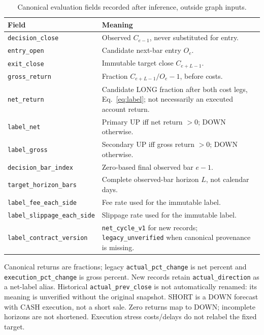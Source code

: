 \begin{table}[htbp]
\centering\small
\caption{Canonical evaluation fields recorded after inference, outside graph inputs.}
\label{tab:target_schema}
\begin{tabularx}{\linewidth}{lX}
\hline
Field & Meaning \\
\hline
\texttt{decision\_close} & Observed $C_{e-1}$, never substituted for entry. \\
\texttt{entry\_open} & Candidate next-bar entry $O_e$. \\
\texttt{exit\_close} & Immutable target close $C_{e+L-1}$. \\
\texttt{gross\_return} & Fraction $C_{e+L-1}/O_e-1$, before costs. \\
\texttt{net\_return} & Candidate LONG fraction after both cost legs, Eq.~\eqref{eq:label}; not necessarily an executed account return. \\
\texttt{label\_net} & Primary UP iff net return $>0$; DOWN otherwise. \\
\texttt{label\_gross} & Secondary UP iff gross return $>0$; DOWN otherwise. \\
\texttt{decision\_bar\_index} & Zero-based final observed bar $e-1$. \\
\texttt{target\_horizon\_bars} & Complete observed-bar horizon $L$, not calendar days. \\
\texttt{label\_fee\_each\_side} & Fee rate used for the immutable label. \\
\texttt{label\_slippage\_each\_side} & Slippage rate used for the immutable label. \\
\texttt{label\_contract\_version} & \texttt{net\_cycle\_v1} for new records; \texttt{legacy\_unverified} when canonical provenance is missing. \\
\hline
\end{tabularx}
\par\smallskip\footnotesize Canonical returns are fractions; legacy \texttt{actual\_pct\_change} is net percent and \texttt{execution\_pct\_change} is gross percent. New records retain \texttt{actual\_direction} as a net-label alias. Historical \texttt{actual\_prev\_close} is not automatically renamed: its meaning is unverified without the original snapshot. SHORT is a DOWN forecast with CASH execution, not a short sale. Zero returns map to DOWN; incomplete horizons are not shortened. Execution stress costs/delays do not relabel the fixed target.
\end{table}
